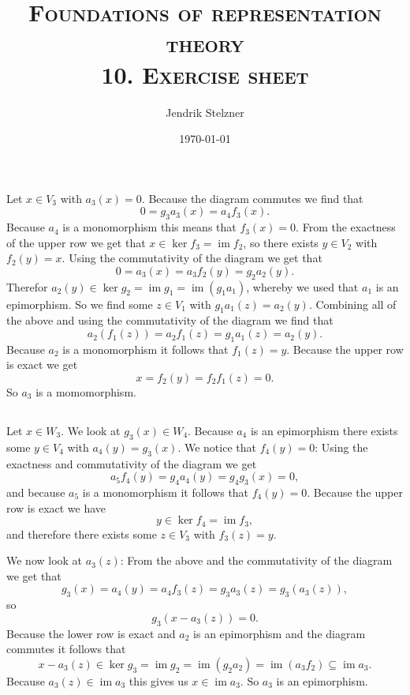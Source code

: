 \documentclass[a4paper,10pt]{article}
\title{\textsc{Foundations of representation theory \\ \Large 10. Exercise sheet}}
\author{Jendrik Stelzner}
\date{\today}
\theoremstyle{definition}
\newcommand{\img}{\operatorname{im}}
\begin{document}
\maketitle





\addtocounter{section}{1}





\section{}


\subsection{}
Let $x \in V_3$ with $a_3(x) = 0$. Because the diagram commutes we find that
\[
 0 = g_3 a_3(x) = a_4 f_3(x).
\]
Because $a_4$ is a monomorphism this means that $f_3(x) = 0$. From the exactness of the upper row we get that $x \in \ker f_3 = \img f_2$, so there exists $y \in V_2$ with $f_2(y) = x$. Using the commutativity of the diagram we get that
\[
 0 = a_3(x) = a_3 f_2(y) = g_2 a_2(y).
\]
Therefor $a_2(y) \in \ker g_2 = \img g_1 = \img (g_1 a_1)$, whereby we used that $a_1$ is an epimorphism. So we find some $z \in V_1$ with $g_1 a_1(z) = a_2(y)$. Combining all of the above and using the commutativity of the diagram we find that
\[
 a_2( f_1(z) ) = a_2 f_1(z) = g_1 a_1(z) = a_2(y).
\]
Because $a_2$ is a monomorphism it follows that $f_1(z) = y$. Because the upper row is exact we get
\[
 x = f_2(y) = f_2 f_1(z) = 0.
\]
So $a_3$ is a momomorphism.


\subsection{}
Let $x \in W_3$. We look at $g_3(x) \in W_4$. Because $a_4$ is an epimorphism there exists some $y \in V_4$ with $a_4(y) = g_3(x)$. We notice that $f_4(y) = 0$: Using the exactness and commutativity of the diagram we get
\[
 a_5 f_4(y) = g_4 a_4(y) = g_4 g_3(x) = 0,
\]
and because $a_5$ is a monomorphism it follows that $f_4(y) = 0$. Because the upper row is exact we have
\[
 y \in \ker f_4 = \img f_3,
\]
and therefore there exists some $z \in V_3$ with $f_3(z) = y$.

We now look at $a_3(z)$: From the above and the commutativity of the diagram we get that
\[
 g_3(x) = a_4(y) = a_4 f_3(z) = g_3 a_3(z) = g_3( a_3(z) ),
\]
so
\[
 g_3( x-a_3(z) ) = 0.
\]
Because the lower row is exact and $a_2$ is an epimorphism and the diagram commutes it follows that
\[
 x - a_3(z) \in \ker g_3 = \img g_2 = \img (g_2 a_2) = \img (a_3 f_2) \subseteq \img a_3.
\]
Because $a_3(z) \in \img a_3$ this gives us $x \in \img a_3$. So $a_3$ is an epimorphism.
\end{document}
